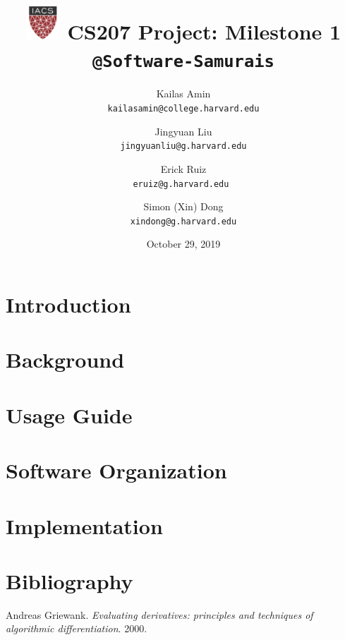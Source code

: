 \documentclass[12pt]{article}
\title{
    \includegraphics[width=0.5in]{images/logo.jpeg}
    CS207 Project: Milestone 1\\
    \large\texttt{@Software-Samurais}
    }
\author{
    Kailas Amin\\ \texttt{kailasamin@college.harvard.edu}
    \and Jingyuan Liu\\ \texttt{jingyuanliu@g.harvard.edu}
    \and Erick Ruiz\\ \texttt{\qquad eruiz@g.harvard.edu  \qquad}
    \and \qquad Simon (Xin) Dong\\ \texttt{\qquad xindong@g.harvard.edu}
    }
\date{October 29, 2019}
\begin{document}
\maketitle

\section{Introduction}

\section{Background}

\section{Usage Guide}

\section{Software Organization}

\section{Implementation}

\section{Bibliography}
Andreas Griewank. \emph{Evaluating derivatives: principles and techniques of algorithmic differentiation}. 2000.
\end{document}
